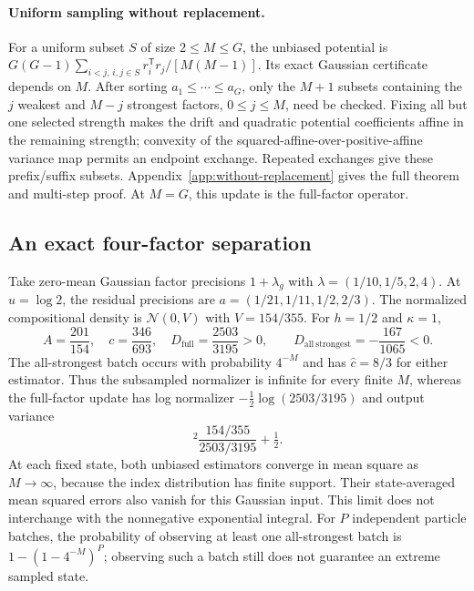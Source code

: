 \documentclass{article}
\newcommand{\Normal}{\mathcal N}
\begin{document}
\paragraph{Uniform sampling without replacement.}
For a uniform subset $S$ of size $2\le M\le G$, the unbiased potential is $G(G-1)\sum_{i<j,\,i,j\in S}r_i^{\mathsf T}r_j/[M(M-1)]$. Its exact Gaussian certificate depends on $M$. After sorting $a_1\le\cdots\le a_G$, only the $M+1$ subsets containing the $j$ weakest and $M-j$ strongest factors, $0\le j\le M$, need be checked. Fixing all but one selected strength makes the drift and quadratic potential coefficients affine in the remaining strength; convexity of the squared-affine-over-positive-affine variance map permits an endpoint exchange. Repeated exchanges give these prefix/suffix subsets. Appendix~\ref{app:without-replacement} gives the full theorem and multi-step proof. At $M=G$, this update is the full-factor operator.

\subsection{An exact four-factor separation}
Take zero-mean Gaussian factor precisions $1+\lambda_g$ with $\lambda=(1/10,1/5,2,4)$. At $u=\log2$, the residual precisions are $a=(1/21,1/11,1/2,2/3)$. The normalized compositional density is $\Normal(0,V)$ with $V=154/355$. For $h=1/2$ and $\kappa=1$,
\begin{equation}\label{eq:counterexample}
 A=\frac{201}{154},\quad c=\frac{346}{693},\quad
 D_{\mathrm{full}}=\frac{2503}{3195}>0,\qquad
 D_{\mathrm{all\ strongest}}=-\frac{167}{1065}<0.
\end{equation}
The all-strongest batch occurs with probability $4^{-M}$ and has $\widehat c=8/3$ for either estimator. Thus the subsampled normalizer is infinite for every finite $M$, whereas the full-factor update has log normalizer $-\tfrac12\log(2503/3195)$ and output variance
\begin{equation}
 [1-\tfrac12(A+\tfrac12)]^2\frac{154/355}{2503/3195}+\tfrac12.
\end{equation}
At each fixed state, both unbiased estimators converge in mean square as $M\to\infty$, because the index distribution has finite support. Their state-averaged mean squared errors also vanish for this Gaussian input. This limit does not interchange with the nonnegative exponential integral. For $P$ independent particle batches, the probability of observing at least one all-strongest batch is $1-(1-4^{-M})^P$; observing such a batch still does not guarantee an extreme sampled state.
\end{document}
